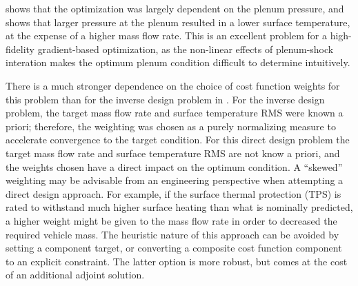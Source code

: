  shows that the optimization was largely dependent on the
plenum pressure, and  shows that larger pressure at the
plenum resulted in a lower surface temperature, at the expense of a higher mass
flow rate.  This is an excellent problem for a high-fidelity gradient-based
optimization, as the non-linear effects of plenum-shock interation makes the
optimum plenum condition difficult to determine intuitively.

There is a much stronger dependence on the choice of cost function weights for
this problem than for the inverse design problem in .  For
the inverse design problem, the target mass flow rate and surface temperature
RMS were known a priori; therefore, the weighting was chosen as a purely
normalizing measure to accelerate convergence to the target condition.  For this
direct design problem the target mass flow rate and surface temperature RMS are
not know a priori, and the weights chosen have a direct impact on the optimum
condition.  A ``skewed'' weighting may be advisable from an engineering
perspective when attempting a direct design approach.  For example, if the
surface thermal protection (TPS) is rated to withstand much higher surface
heating than what is nominally predicted, a higher weight might be given to the
mass flow rate in order to decreased the required vehicle mass.  The heuristic
nature of this approach can be avoided by setting a component target, or
converting a composite cost function component to an explicit constraint.  The
latter option is more robust, but comes at the cost of an additional adjoint
solution.
